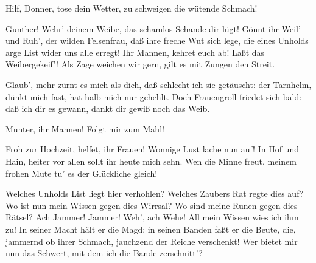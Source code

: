 \begin{drama}


Hilf, Donner, tose dein Wetter,
zu schweigen die wütende Schmach!
 

\Siegfriedspeaks

Gunther! Wehr' deinem Weibe,
das schamlos Schande dir lügt!
Gönnt ihr Weil' und Ruh',
der wilden Felsenfrau,
daß ihre freche Wut sich lege,
die eines Unholds arge List
wider uns alle erregt!
Ihr Mannen, kehret euch ab!
Laßt das Weibergekeif'!
Als Zage weichen wir gern,
gilt es mit Zungen den Streit.


Glaub', mehr zürnt es mich als dich,
daß schlecht ich sie getäuscht:
der Tarnhelm, dünkt mich fast,
hat halb mich nur gehehlt.
Doch Frauengroll friedet sich bald:
daß ich dir es gewann,
dankt dir gewiß noch das Weib.


Munter, ihr Mannen!
Folgt mir zum Mahl!


Froh zur Hochzeit, helfet, ihr Frauen!
Wonnige Lust lache nun auf!
In Hof und Hain,
heiter vor allen sollt ihr heute mich sehn.
Wen die Minne freut,
meinem frohen Mute
tu' es der Glückliche gleich!
 






\Brunnhildespeaks



Welches Unholds List liegt hier verhohlen?
Welches Zaubers Rat regte dies auf?
Wo ist nun mein Wissen gegen dies Wirrsal?
Wo sind meine Runen gegen dies Rätsel?
Ach Jammer! Jammer! Weh', ach Wehe!
All mein Wissen wies ich ihm zu!
In seiner Macht hält er die Magd;
in seinen Banden faßt er die Beute,
die, jammernd ob ihrer Schmach,
jauchzend der Reiche verschenkt!
Wer bietet mir nun das Schwert,
mit dem ich die Bande zerschnitt'?
 


\end{drama}
